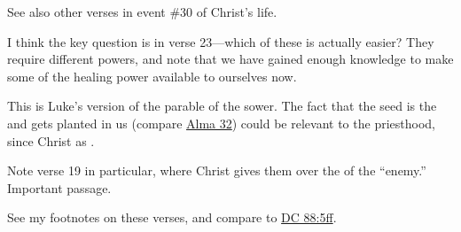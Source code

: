 \begin{compactdesc}
\begin{compactitem}
					\end{compactitem}
				\item[{\hyperref[MARK-14-62]{Mark 14:62}}]
				\item[{\hyperref[LUKE-4-36]{Luke 4:36}}] \phantom{.}
					\begin{compactitem}
						\item See also other verses in event \#30 of Christ's life.
					\end{compactitem}
				\item[{\hyperref[LUKE-5-17]{Luke 5:17--26}}]
					\begin{compactitem}
						\item I think the key question is in verse 23---which of these is actually easier? They require different powers, and note that we have gained enough knowledge to make some of the healing power available to ourselves now.
					\end{compactitem}
				\item[{\hyperref[LUKE-7-2]{Luke 7:2--10}}]
				\item[{\hyperref[LUKE-8-4]{Luke 8:4--18}}] \phantom{.}
					\begin{compactitem}
						\item This is Luke's version of the parable of the sower. The fact that the seed is the  and gets planted in us (compare \hyperref[ALMA-32]{Alma 32}) could be relevant to the priesthood, since Christ as .
					\end{compactitem}
				\item[{\hyperref[LUKE-10-17]{Luke 10:17--20}}] \phantom{.}
					\begin{compactitem}
						\item Note verse 19 in particular, where Christ gives them  over the  of the ``enemy.'' Important passage.
					\end{compactitem}
				\item[{\hyperref[LUKE-10-22]{Luke 10:22}}] \phantom{.}
				\item[{\hyperref[LUKE-11-33]{Luke 11:33--36}}] \phantom{.}
					\begin{compactitem}
						\item See my footnotes on these verses, and compare to \hyperref[DC88-5]{DC 88:5ff}.
					\end{compactitem}
				\item[{\hyperref[LUKE-12-42]{Luke 12:42--44}}] \phantom{.}
				\item[{\hyperref[LUKE-17-20]{Luke 17:20--21}}] \phantom{.}

\end{compactdesc}
